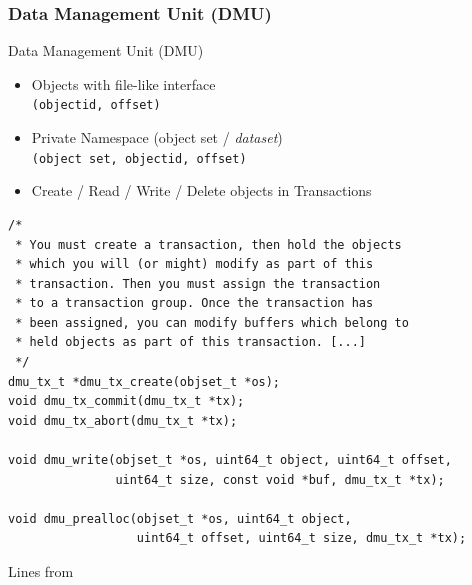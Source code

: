 \subsubsection{Data Management Unit (DMU)}
\begin{frame}{Data Management Unit (DMU)}
	\begin{itemize}
	\item Objects with file-like interface \\ \texttt{(objectid, offset)}
	\item Private Namespace (object set / \emph{dataset}) \\ \texttt{(\alert{object set}, objectid, offset)}
	\item Create / Read / Write / Delete objects in Transactions
	\end{itemize}
\pagebreak
\small
\vspace{-2em}
\begin{verbatim}
/*
 * You must create a transaction, then hold the objects
 * which you will (or might) modify as part of this
 * transaction. Then you must assign the transaction 
 * to a transaction group. Once the transaction has
 * been assigned, you can modify buffers which belong to
 * held objects as part of this transaction. [...]
 */
dmu_tx_t *dmu_tx_create(objset_t *os);
void dmu_tx_commit(dmu_tx_t *tx);
void dmu_tx_abort(dmu_tx_t *tx);

void dmu_write(objset_t *os, uint64_t object, uint64_t offset,
               uint64_t size, const void *buf, dmu_tx_t *tx);
               
void dmu_prealloc(objset_t *os, uint64_t object,
                  uint64_t offset, uint64_t size, dmu_tx_t *tx);
\end{verbatim}
\centering
\tiny \hfill Lines from \cite{openzfssrc_dmu}
\end{frame}

